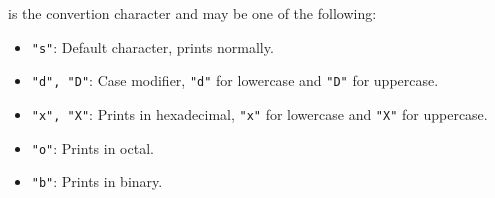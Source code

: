\noindent
{} is the convertion character and may be one of the following:
\begin{itemize}
\item \verb&"s"&: Default character, prints normally.
\item \verb&"d", "D"&: Case modifier, \verb&"d"& for lowercase and
  \verb&"D"& for uppercase.
\item \verb&"x", "X"&: Prints in hexadecimal, \verb&"x"& for lowercase
  and \verb&"X"& for uppercase.
\item \verb&"o"&: Prints in octal.
\item \verb&"b"&: Prints in binary.
\end{itemize}

